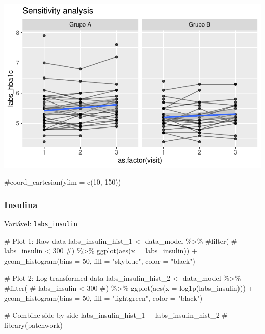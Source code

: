 \documentclass[
  12pt,
]{article}
\newenvironment{Shaded}{\begin{snugshade}}{\end{snugshade}}
\newcommand{\AttributeTok}[1]{\textcolor[rgb]{0.40,0.45,0.13}{#1}}
\newcommand{\CommentTok}[1]{\textcolor[rgb]{0.37,0.37,0.37}{#1}}
\newcommand{\DecValTok}[1]{\textcolor[rgb]{0.68,0.00,0.00}{#1}}
\newcommand{\FunctionTok}[1]{\textcolor[rgb]{0.28,0.35,0.67}{#1}}
\newcommand{\NormalTok}[1]{\textcolor[rgb]{0.00,0.23,0.31}{#1}}
\newcommand{\OtherTok}[1]{\textcolor[rgb]{0.00,0.23,0.31}{#1}}
\newcommand{\SpecialCharTok}[1]{\textcolor[rgb]{0.37,0.37,0.37}{#1}}
\newcommand{\StringTok}[1]{\textcolor[rgb]{0.13,0.47,0.30}{#1}}
\begin{document}
\includegraphics{Outcomes_files/figure-pdf/labs_hba1c_6-2.pdf}

\begin{Shaded}
\begin{Highlighting}[]
    \CommentTok{\#coord\_cartesian(ylim = c(10, 150))}
\end{Highlighting}
\end{Shaded}

\subsubsection{Insulina}\label{insulina}

Variável: \texttt{labs\_insulin}

\begin{Shaded}
\begin{Highlighting}[]
\CommentTok{\# Plot 1: Raw data}
\NormalTok{labs\_insulin\_hist\_1 }\OtherTok{\textless{}{-}}\NormalTok{ data\_model }\SpecialCharTok{\%\textgreater{}\%} 
    \CommentTok{\#filter(}
    \CommentTok{\#    labs\_insulin \textless{} 300}
    \CommentTok{\#) \%\textgreater{}\% }
    \FunctionTok{ggplot}\NormalTok{(}\FunctionTok{aes}\NormalTok{(}\AttributeTok{x =}\NormalTok{ labs\_insulin)) }\SpecialCharTok{+} 
    \FunctionTok{geom\_histogram}\NormalTok{(}\AttributeTok{bins =} \DecValTok{50}\NormalTok{, }\AttributeTok{fill =} \StringTok{"skyblue"}\NormalTok{, }\AttributeTok{color =} \StringTok{"black"}\NormalTok{)}

\CommentTok{\# Plot 2: Log{-}transformed data}
\NormalTok{labs\_insulin\_hist\_2 }\OtherTok{\textless{}{-}}\NormalTok{ data\_model }\SpecialCharTok{\%\textgreater{}\%} 
    \CommentTok{\#filter(}
    \CommentTok{\#    labs\_insulin \textless{} 300}
    \CommentTok{\#) \%\textgreater{}\%}
    \FunctionTok{ggplot}\NormalTok{(}\FunctionTok{aes}\NormalTok{(}\AttributeTok{x =} \FunctionTok{log1p}\NormalTok{(labs\_insulin))) }\SpecialCharTok{+} 
    \FunctionTok{geom\_histogram}\NormalTok{(}\AttributeTok{bins =} \DecValTok{50}\NormalTok{, }\AttributeTok{fill =} \StringTok{"lightgreen"}\NormalTok{, }\AttributeTok{color =} \StringTok{"black"}\NormalTok{)}

\CommentTok{\# Combine side by side}
\NormalTok{labs\_insulin\_hist\_1 }\SpecialCharTok{+}\NormalTok{ labs\_insulin\_hist\_2 }\CommentTok{\# library(patchwork)}
\end{Highlighting}
\end{Shaded}
\end{document}
